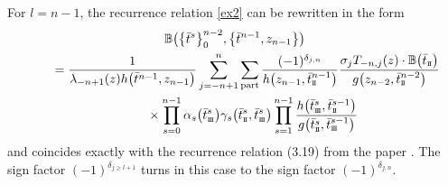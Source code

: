 \documentclass[pdftex]{sigma}
\newcommand{\st}{\scriptscriptstyle \rm I\hspace{-1pt}I}
\newcommand{\sth}{\scriptscriptstyle \rm I\hspace{-1pt}I\hspace{-1pt}I}
\newcommand{\bt}{{\bar t}}
\theoremstyle{definition}
\def\BB{{\mathbb{B}}}
\def\r#1{\eqref{#1}}
\begin{document}
\begin{itemize}
For $l=n-1$, the recurrence relation \r{ex2} can be rewritten in the form
\begin{gather*}%
 \BB\bigl(\bigl\{\bt^s\bigr\}_{0}^{n-2},\bigl\{\bt^{n-1},z_{n-1}\bigr\}\bigr)
 \\
\qquad = \frac{1}{\lambda_{-n+1}(z) h\bigl(\bt^{n-1},z_{n-1}\bigr)} \sum_{j=-n+1}^n\sum_{\rm part}
 \frac{(-1)^{\delta_{j,n}}}{h\bigl(z_{n-1},\bt^{n-1}_{\st}\bigr)}
 \frac{\sigma_{j} T_{-n,j}(z)\cdot\BB\bigl(\bt_{\st}\bigr)}{g\bigl(z_{n-2},\bt^{n-2}_{\st}\bigr)}\\
 \qquad\phantom{=}{}\times
 \prod_{s=0}^{n-1}\alpha_s\bigl(\bt^s_{\sth}\bigr)\gamma_s\bigl(\bt^s_{\st},\bt^s_{\sth}\bigr)
 \prod_{s=1}^{n-1}\frac{h\bigl(\bt^s_{\sth},\bt^{s-1}_{\st}\bigr)}{g\bigl(\bt^s_{\st},\bt^{s-1}_{\sth}\bigr)}
 \end{gather*}
and
coincides exactly with the
recurrence relation (3.19) from the paper \cite{LP2}. The sign factor $(-1)^{\delta_{j\geq l+1}}$
turns in this case to the sign factor $(-1)^{\delta_{j,n}}$.




\end{itemize}
\end{document}
